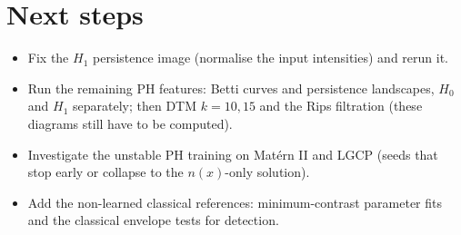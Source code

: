 \documentclass[10pt,a4paper]{article}
\begin{document}
\section{Next steps}

\begin{itemize}
  \item Fix the $H_1$ persistence image (normalise the input intensities) and rerun it.
  \item Run the remaining PH features: Betti curves and persistence landscapes, $H_0$ and $H_1$ separately; then DTM $k=10, 15$ and the Rips filtration (these diagrams still have to be computed).
  \item Investigate the unstable PH training on Mat\'ern II and LGCP (seeds that stop early or collapse to the $n(x)$-only solution).
  \item Add the non-learned classical references: minimum-contrast parameter fits and the classical envelope tests for detection.
\end{itemize}
\end{document}

